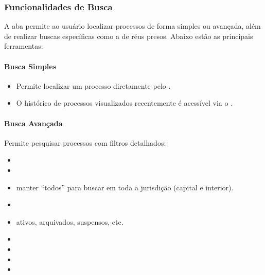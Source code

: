\documentclass[letterpaper,10pt,brazil]{sphinxmanual}
\begin{document}
\subsubsection{Funcionalidades de Busca}
\label{\detokenize{projud_43_buscarelacaoreupreso:funcionalidades-de-busca}}
\sphinxAtStartPar
A aba  permite ao usuário localizar processos de forma simples ou avançada, além de realizar buscas específicas como a de réus presos. Abaixo estão as principais ferramentas:


\paragraph{Busca Simples}
\label{\detokenize{projud_43_buscarelacaoreupreso:busca-simples}}\begin{itemize}
\item {} 
\sphinxAtStartPar
Permite localizar um processo diretamente pelo .

\item {} 
\sphinxAtStartPar
O histórico de processos visualizados recentemente é acessível via o .

\end{itemize}


\paragraph{Busca Avançada}
\label{\detokenize{projud_43_buscarelacaoreupreso:busca-avancada}}
\sphinxAtStartPar
Permite pesquisar processos com filtros detalhados:
\begin{itemize}
\item {} 
\sphinxAtStartPar
{}

\item {} 
\sphinxAtStartPar
{}

\item {} 
\sphinxAtStartPar
{} manter “todos” para buscar em toda a jurisdição (capital e interior).

\item {} 
\sphinxAtStartPar
{}

\item {} 
\sphinxAtStartPar
{} ativos, arquivados, suspensos, etc.

\item {} 
\sphinxAtStartPar
{}

\item {} 
\sphinxAtStartPar
{}

\item {} 
\sphinxAtStartPar
{}

\item {} 
\sphinxAtStartPar
{}

\end{itemize}
\end{document}
